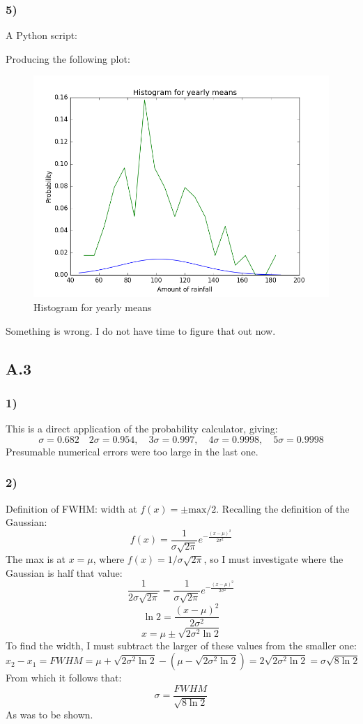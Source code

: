 \documentclass[a4paper,10pt,english]{article}
\begin{document}
\subsubsection*{5)}
A Python script:

Producing the following plot:
\begin{figure}[h!]
        \centering 
        \includegraphics[scale=0.5]{yearly_means_Gauss.png} 
        \caption{Histogram for yearly means}
        \label{fig:Yearly_Means}
\end{figure}
Something is wrong. I do not have time to figure that out now.\\
\subsection*{A.3}
\subsubsection*{1)}
This is a direct application of the probability calculator, giving:
$$\sigma = 0.682 \quad 2\sigma=0.954, \quad 3\sigma = 0.997, \quad 4\sigma = 0.9998, \quad 5\sigma =0.9998$$
Presumable numerical errors were too large in the last one.
\subsubsection*{2)}
Definition of FWHM: width at $f(x)=\pm \mathrm{max}/2$. Recalling the definition of the Gaussian:
$$f(x)=\frac{1}{\sigma \sqrt{2\pi}}e^{-\frac{(x-\mu)^2}{2\sigma^2}}$$
The max is at $x=\mu$, where $f(x)=1/\sigma \sqrt{2\pi}$, so I must investigate where the Gaussian is half that value:
$$\frac{1}{2\sigma \sqrt{2\pi}}=\frac{1}{\sigma \sqrt{2\pi}}e^{-\frac{(x-\mu)^2}{2\sigma^2}}$$
$$\ln 2 = \frac{(x-\mu)^2}{2\sigma^2}$$
$$x=\mu \pm\sqrt{2\sigma^2 \ln 2}$$
To find the width, I must subtract the larger of these values from the smaller one:
$$x_2-x_1=FWHM=\mu+\sqrt{2\sigma^2 \ln 2}-(\mu - \sqrt{2\sigma^2 \ln 2})=2\sqrt{2\sigma^2 \ln 2}=\sigma  \sqrt{8\ln 2}$$
From which it follows that:
$$\sigma=\frac{FWHM}{\sqrt{8\ln 2}}$$
As was to be shown.
\end{document}
